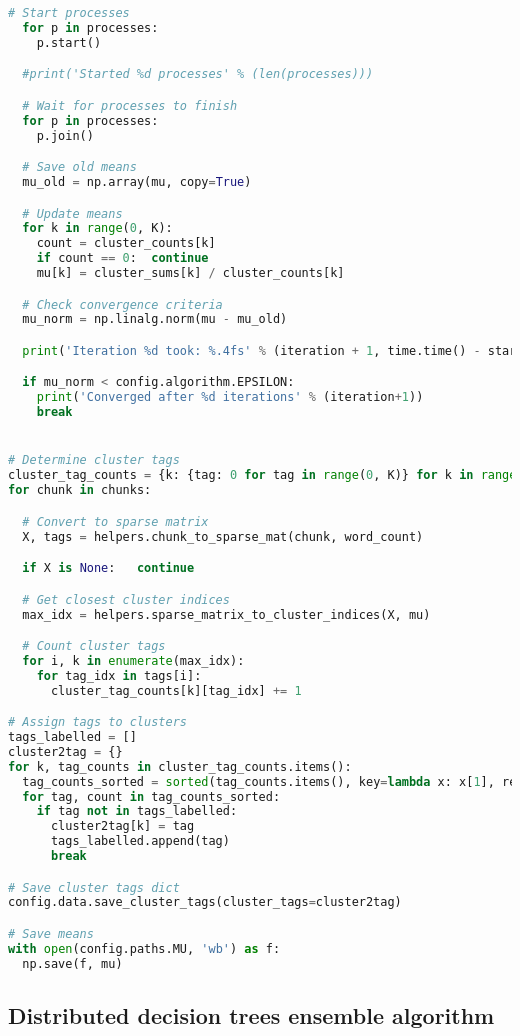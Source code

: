 \begin{lstlisting}[language=python]
  # Start processes
  for p in processes:
    p.start()

  #print('Started %d processes' % (len(processes)))

  # Wait for processes to finish
  for p in processes:
    p.join()

  # Save old means
  mu_old = np.array(mu, copy=True)

  # Update means
  for k in range(0, K):
    count = cluster_counts[k]
    if count == 0:  continue
    mu[k] = cluster_sums[k] / cluster_counts[k]

  # Check convergence criteria
  mu_norm = np.linalg.norm(mu - mu_old)

  print('Iteration %d took: %.4fs' % (iteration + 1, time.time() - start))

  if mu_norm < config.algorithm.EPSILON:
    print('Converged after %d iterations' % (iteration+1))
    break


# Determine cluster tags
cluster_tag_counts = {k: {tag: 0 for tag in range(0, K)} for k in range(0, K)}
for chunk in chunks:

  # Convert to sparse matrix
  X, tags = helpers.chunk_to_sparse_mat(chunk, word_count)

  if X is None:   continue

  # Get closest cluster indices
  max_idx = helpers.sparse_matrix_to_cluster_indices(X, mu)

  # Count cluster tags
  for i, k in enumerate(max_idx):
    for tag_idx in tags[i]:
      cluster_tag_counts[k][tag_idx] += 1

# Assign tags to clusters
tags_labelled = []
cluster2tag = {}
for k, tag_counts in cluster_tag_counts.items():
  tag_counts_sorted = sorted(tag_counts.items(), key=lambda x: x[1], reverse=True)
  for tag, count in tag_counts_sorted:
    if tag not in tags_labelled:
      cluster2tag[k] = tag
      tags_labelled.append(tag)
      break

# Save cluster tags dict
config.data.save_cluster_tags(cluster_tags=cluster2tag)

# Save means
with open(config.paths.MU, 'wb') as f:
  np.save(f, mu)
\end{lstlisting}

\subsection{Distributed decision trees ensemble algorithm}
\label{app:decision-trees}

